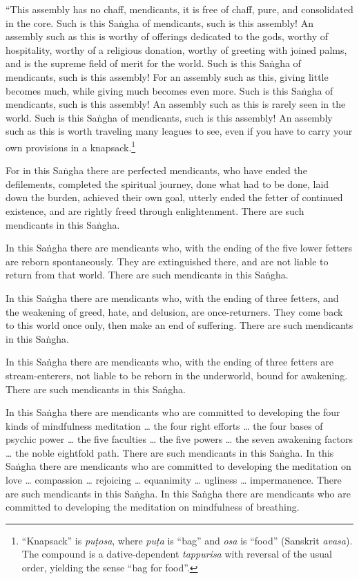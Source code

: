 \documentclass[12pt,openany]{book}%
\begin{document}
“This assembly has no chaff, mendicants, it is free of chaff, pure, and consolidated in the core. Such is this \textsanskrit{Saṅgha} of mendicants, such is this assembly! An assembly such as this is worthy of offerings dedicated to the gods, worthy of hospitality, worthy of a religious donation, worthy of greeting with joined palms, and is the supreme field of merit for the world. Such is this \textsanskrit{Saṅgha} of mendicants, such is this assembly! For an assembly such as this, giving little becomes much, while giving much becomes even more. Such is this \textsanskrit{Saṅgha} of mendicants, such is this assembly! An assembly such as this is rarely seen in the world. Such is this \textsanskrit{Saṅgha} of mendicants, such is this assembly! An assembly such as this is worth traveling many leagues to see, even if you have to carry your own provisions in a knapsack.\footnote{“Knapsack” is \textit{\textsanskrit{puṭosa}}, where \textit{\textsanskrit{puṭa}} is “bag” and \textit{osa} is “food” (Sanskrit \textit{avasa}). The compound is a dative-dependent \textit{tappurisa} with reversal of the usual order, yielding the sense “bag for food”. } 

For in this \textsanskrit{Saṅgha} there are perfected mendicants, who have ended the defilements, completed the spiritual journey, done what had to be done, laid down the burden, achieved their own goal, utterly ended the fetter of continued existence, and are rightly freed through enlightenment. There are such mendicants in this \textsanskrit{Saṅgha}. 

In this \textsanskrit{Saṅgha} there are mendicants who, with the ending of the five lower fetters are reborn spontaneously. They are extinguished there, and are not liable to return from that world. There are such mendicants in this \textsanskrit{Saṅgha}. 

In this \textsanskrit{Saṅgha} there are mendicants who, with the ending of three fetters, and the weakening of greed, hate, and delusion, are once-returners. They come back to this world once only, then make an end of suffering. There are such mendicants in this \textsanskrit{Saṅgha}. 

In this \textsanskrit{Saṅgha} there are mendicants who, with the ending of three fetters are stream-enterers, not liable to be reborn in the underworld, bound for awakening. There are such mendicants in this \textsanskrit{Saṅgha}. 

In this \textsanskrit{Saṅgha} there are mendicants who are committed to developing the four kinds of mindfulness meditation … the four right efforts … the four bases of psychic power … the five faculties … the five powers … the seven awakening factors … the noble eightfold path. There are such mendicants in this \textsanskrit{Saṅgha}. In this \textsanskrit{Saṅgha} there are mendicants who are committed to developing the meditation on love … compassion … rejoicing … equanimity … ugliness … impermanence. There are such mendicants in this \textsanskrit{Saṅgha}. In this \textsanskrit{Saṅgha} there are mendicants who are committed to developing the meditation on mindfulness of breathing. 
\end{document}
